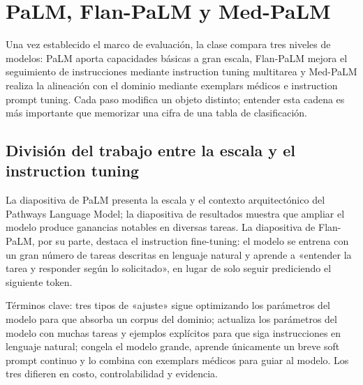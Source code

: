 \section{PaLM, Flan-PaLM y Med-PaLM}

Una vez establecido el marco de evaluación, la clase compara tres niveles de modelos: PaLM aporta capacidades básicas a gran escala, Flan-PaLM mejora el seguimiento de instrucciones mediante instruction tuning multitarea y Med-PaLM realiza la alineación con el dominio mediante exemplars médicos e instruction prompt tuning. Cada paso modifica un objeto distinto; entender esta cadena es más importante que memorizar una cifra de una tabla de clasificación.

\subsection{División del trabajo entre la escala y el instruction tuning}

La diapositiva de PaLM presenta la escala y el contexto arquitectónico del Pathways Language Model; la diapositiva de resultados muestra que ampliar el modelo produce ganancias notables en diversas tareas. La diapositiva de Flan-PaLM, por su parte, destaca el instruction fine-tuning: el modelo se entrena con un gran número de tareas descritas en lenguaje natural y aprende a «entender la tarea y responder según lo solicitado», en lugar de solo seguir prediciendo el siguiente token.




\begin{knowledgebox}{Términos clave: tres tipos de «ajuste»}
 sigue optimizando los parámetros del modelo para que absorba un corpus del dominio;  actualiza los parámetros del modelo con muchas tareas y ejemplos explícitos para que siga instrucciones en lenguaje natural;  congela el modelo grande, aprende únicamente un breve soft prompt continuo y lo combina con exemplars médicos para guiar al modelo. Los tres difieren en costo, controlabilidad y evidencia.
\end{knowledgebox}


